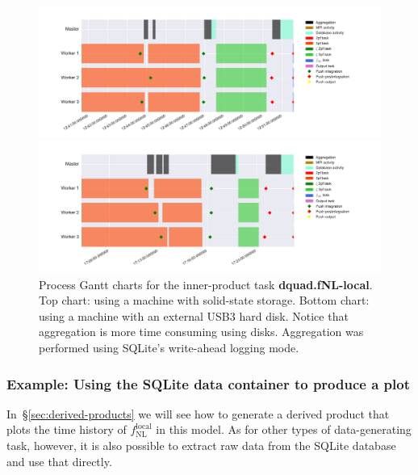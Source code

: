 \documentclass[11pt,a4paper]{article}
\newcommand{\fNL}{f_{\mathrm{NL}}}
\newcommand{\fNLlocal}{\fNL^{\text{local}}}
\newcommand{\repoobject}[1]{{\ttfamily\bfseries\small #1}}
\newcommand{\packagefont}{\sffamily}
\newcommand{\SQLite}{{\packagefont SQLite}}
\begin{document}
\begin{figure}
    \begin{center}
        \includegraphics[scale=0.5]{Outputs/gantt-fNL-arun}
    \end{center}
    \begin{center}
    	\includegraphics[scale=0.5]{Outputs/gantt-fNL-taff}	
    \end{center}

    \caption{\label{fig:gantt-fNL}Process Gantt charts for the inner-product task \repoobject{dquad.fNL-local}.
    Top chart: using a machine with solid-state storage.
    Bottom chart: using a machine with an external USB3 hard disk.
    Notice that aggregation is more time consuming using disks.
    Aggregation was performed using {\SQLite}'s write-ahead logging mode.}
\end{figure}

\subsubsection{Example: Using the {\SQLite} data container to produce a plot}
In~\S\ref{sec:derived-products}
we will see how to generate a derived product
that plots the time history of
$\fNLlocal$ in this model.
As for other types of data-generating task, however, it is also possible to extract
raw data from the {\SQLite} database
and use that directly.
\end{document}
